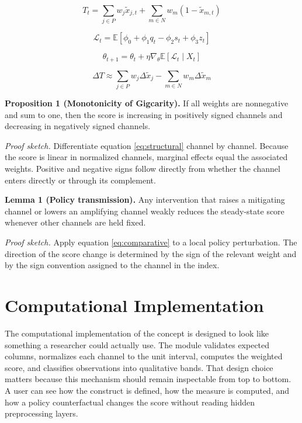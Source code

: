 \documentclass[12pt]{article}
\begin{document}
\begin{equation}
T_t = \sum_{j \in P} w_j \tilde{x}_{j,t} + \sum_{m \in N} w_m (1 - \tilde{x}_{m,t})
\label{eq:structural}
\end{equation}

\begin{equation}
\mathcal{L}_t = \mathbb{E}\left[\phi_0 + \phi_1 q_t - \phi_2 s_t + \phi_3 z_t\right]
\label{eq:loss}
\end{equation}

\begin{equation}
\theta_{t+1} = \theta_t + \eta \nabla_\theta \mathbb{E}[\mathcal{L}_t \mid X_t]
\label{eq:update}
\end{equation}

\begin{equation}
\Delta T \approx \sum_{j \in P} w_j \Delta \tilde{x}_j - \sum_{m \in N} w_m \Delta \tilde{x}_m
\label{eq:comparative}
\end{equation}

\textbf{Proposition 1 (Monotonicity of Gigcarity).} If all weights are nonnegative and sum to one, then the score is increasing in positively signed channels and decreasing in negatively signed channels.

\textit{Proof sketch.} Differentiate equation \eqref{eq:structural} channel by channel. Because the score is linear in normalized channels, marginal effects equal the associated weights. Positive and negative signs follow directly from whether the channel enters directly or through its complement.

\textbf{Lemma 1 (Policy transmission).} Any intervention that raises a mitigating channel or lowers an amplifying channel weakly reduces the steady-state score whenever other channels are held fixed.

\textit{Proof sketch.} Apply equation \eqref{eq:comparative} to a local policy perturbation. The direction of the score change is determined by the sign of the relevant weight and by the sign convention assigned to the channel in the index.

\section{Computational Implementation}
The computational implementation of the concept is designed to look like something a researcher could actually use. The module validates expected columns, normalizes each channel to the unit interval, computes the weighted score, and classifies observations into qualitative bands. That design choice matters because this mechanism should remain inspectable from top to bottom. A user can see how the construct is defined, how the measure is computed, and how a policy counterfactual changes the score without reading hidden preprocessing layers.
\end{document}
